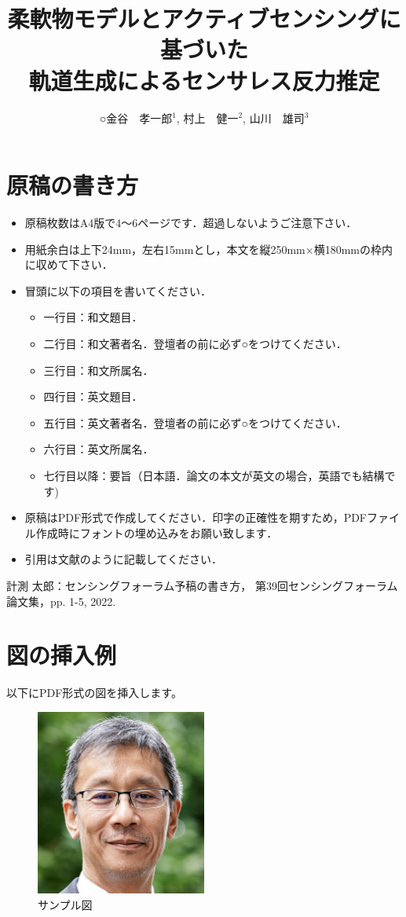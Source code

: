 \documentclass[a4paper]{jarticle}
\title{柔軟物モデルとアクティブセンシングに基づいた\\軌道生成によるセンサレス反力推定}
\author{○金谷　孝一郎$^1$, 村上　健一$^2$, 山川　雄司$^3$}
\affiliation{
$^1$ 東京大学,
$^2$ 東京大学,
$^3$ 東京大学 }
\begin{document}
\maketitle
\iffalse
\section{原稿の書き方}
\begin{itemize}
\item 原稿枚数はA4版で4～6ページです．超過しないようご注意下さい．
\item 用紙余白は上下24mm，左右15mmとし，本文を縦250mm×横180mmの枠内に収めて下さい．
\item 冒頭に以下の項目を書いてください．
\begin{itemize}
\item 一行目：和文題目．
\item 二行目：和文著者名．登壇者の前に必ず○をつけてください．
\item 三行目：和文所属名．
\item 四行目：英文題目．
\item 五行目：英文著者名．登壇者の前に必ず○をつけてください．
\item 六行目：英文所属名．
\item 七行目以降：要旨（日本語．論文の本文が英文の場合，英語でも結構です)
\end{itemize}
\item 原稿はPDF形式で作成してください．印字の正確性を期すため，PDFファイル作成時にフォントの埋め込みをお願い致します．
\item 引用は文献\cite{ref1}のように記載してください．
\end{itemize}
\begin{thebibliography}{9}
計測 太郎：センシングフォーラム予稿の書き方，
第39回センシングフォーラム論文集，pp. 1-5, 2022.
\end{thebibliography}
\section{図の挿入例}
以下にPDF形式の図を挿入します。

\begin{figure}[htbp]
    \centering
    \includegraphics[width=0.5\textwidth]{example.pdf}
    \caption{サンプル図}
    \label{fig:sample}
\end{figure}
\end{document}
